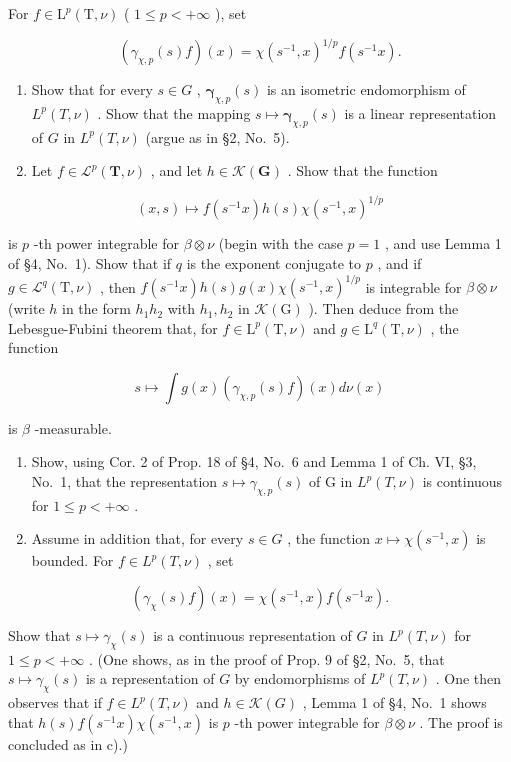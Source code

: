 For \(f \in \mathrm{L}^p(\mathrm{T}, \nu)\) ( \(1 \leqslant p < +\infty\) ), set

\[
\left(\gamma_ {\chi , p} (s) f\right) (x) = \chi (s ^ {- 1}, x) ^ {1 / p} f (s ^ {- 1} x).
\]

\begin{enumerate}
\def\labelenumi{\alph{enumi})}
\item
  Show that for every \(s \in G\) , \(\pmb{\gamma}_{\chi,p}(s)\) is an isometric endomorphism of \(L^p(T, \nu)\) . Show that the mapping \(s \mapsto \pmb{\gamma}_{\chi,p}(s)\) is a linear representation of \(G\) in \(L^p(T, \nu)\) (argue as in §2, No.~5).
\item
  Let \(f \in \mathcal{L}^p(\mathbf{T}, \nu)\) , and let \(h \in \mathcal{K}(\mathbf{G})\) . Show that the function
\end{enumerate}

\[
(x, s) \mapsto f (s ^ {- 1} x) h (s) \chi (s ^ {- 1}, x) ^ {1 / p}
\]

is \(p\) -th power integrable for \(\beta \otimes \nu\) (begin with the case \(p = 1\) , and use Lemma 1 of §4, No.~1). Show that if \(q\) is the exponent conjugate to \(p\) , and if \(g \in \mathcal{L}^q(\mathrm{T}, \nu)\) , then \(f(s^{-1}x)h(s)g(x)\chi(s^{-1},x)^{1/p}\) is integrable for \(\beta\otimes\nu\) (write \(h\) in the form \(h_1h_2\) with \(h_1,h_2\) in \(\mathcal{K}(\mathrm{G})\) ). Then deduce from the Lebesgue-Fubini theorem that, for \(f\in\mathrm{L}^{p}(\mathrm{T},\nu)\) and \(g\in\mathrm{L}^{q}(\mathrm{T},\nu)\) , the function

\[
s \mapsto \int g (x) (\gamma_ {\chi , p} (s) f) (x) d \nu (x)
\]

is \(\beta\) -measurable.

\begin{enumerate}
\def\labelenumi{\alph{enumi})}
\setcounter{enumi}{2}
\item
  Show, using Cor. 2 of Prop. 18 of §4, No.~6 and Lemma 1 of Ch. VI, §3, No.~1, that the representation \(s \mapsto \gamma_{\chi,p}(s)\) of G in \(L^p(T, \nu)\) is continuous for \(1 \leqslant p < +\infty\) .
\item
  Assume in addition that, for every \(s \in G\) , the function \(x \mapsto \chi(s^{-1}, x)\) is bounded. For \(f \in L^{p}(T, \nu)\) , set
\end{enumerate}

\[
\left(\gamma_ {\chi} (s) f\right) (x) = \chi (s ^ {- 1}, x) f (s ^ {- 1} x).
\]

Show that \(s \mapsto \gamma_{\chi}(s)\) is a continuous representation of \(G\) in \(L^p(T, \nu)\) for \(1 \leqslant p < +\infty\) . (One shows, as in the proof of Prop. 9 of §2, No.~5, that \(s \mapsto \gamma_{\chi}(s)\) is a representation of \(G\) by endomorphisms of \(L^p(T, \nu)\) . One then observes that if \(f \in L^p(T, \nu)\) and \(h \in \mathcal{K}(G)\) , Lemma 1 of §4, No.~1 shows that \(h(s)f(s^{-1}x)\chi(s^{-1}, x)\) is \(p\) -th power integrable for \(\beta \otimes \nu\) . The proof is concluded as in c).)

